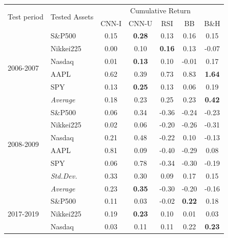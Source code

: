 \documentclass[11pt, a4paper]{article}
\begin{document}
\begin{table}[H]
\centering
\begin{tabular}{l|l|ccccc}
\multicolumn{1}{m{1cm}|}{\multirow{2}{1cm}{Test period}} & \multicolumn{1}{m{1.5cm}|}{\multirow{2}{1.5cm}{Tested Assets}} &       \multicolumn{5}{c}{Cumulative Return}  \\ \cline{3-7}
  &                  &  CNN-I         & CNN-U         & RSI           & BB            & B\&H \\ \hline \hline
\multirow{6}{1cm}{2006-2007}  & S\&P500          & 0.15              & \textbf{0.28} & 0.13          & 0.16          & 0.15          \\
  & Nikkei225        & 0.00              & 0.10          & \textbf{0.16} & 0.13          & -0.07         \\
  & Nasdaq           & 0.01              & \textbf{0.13} & 0.10          & -0.01         & 0.17          \\
  & AAPL             & 0.62              & 0.39          & 0.73          & 0.83          & \textbf{1.64} \\
  & SPY              & 0.13              & \textbf{0.25} & 0.13          & 0.06          & 0.19          \\ \cline{2-7}
  & \textit{Average} & 0.18              & 0.23          & 0.25          & 0.23          & \textbf{0.42} \\ \hline
\multirow{6}{1cm}{2008-2009} & S\&P500           & 0.06 & 0.34 & -0.36 & -0.24 & -0.23 \\
 & Nikkei225         & 0.02 & 0.06 & -0.20 & -0.26 & -0.31 \\
 & Nasdaq            & 0.21 & 0.48 & -0.22 & 0.10  & -0.13 \\
 & AAPL              & 0.81 & 0.09 & -0.40 & -0.29 & 0.08  \\
 & SPY               & 0.06 & 0.78 & -0.34 & -0.30 & -0.19 \\ \cline{2-7} 
 & \textit{Std.Dev.} & 0.33 & 0.30 & 0.09  & 0.17  & 0.15  \\ \cline{2-7} 
 & \textit{Average}  & 0.23 & \textbf{0.35} & -0.30 & -0.20 & -0.16 \\ \hline
\multirow{6}{1cm}{2017-2019} &  S\&P500          & 0.11              & 0.03          & -0.02         & \textbf{0.22} & 0.18          \\
  & Nikkei225        & 0.19              & \textbf{0.23} & 0.10          & 0.01          & 0.03          \\
  & Nasdaq           & 0.03              & 0.11          & 0.11          & 0.22          & \textbf{0.23} \\

\end{tabular}
\end{table}
\end{document}
